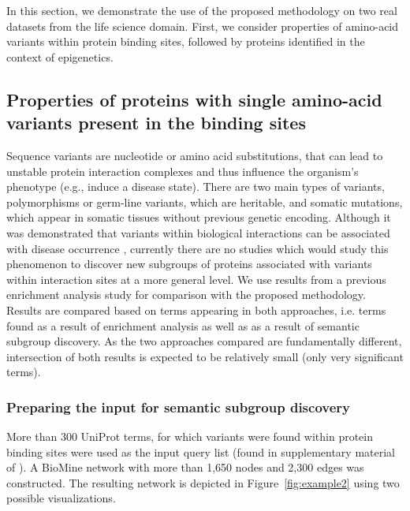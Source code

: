 \documentclass[oribibl,runningheads,a4paper]{llncs}
\begin{document}
In this section, we demonstrate the use of the proposed methodology on two real datasets from the life science domain. First, we consider properties of amino-acid variants within protein binding sites, followed by proteins identified in the context of epigenetics. %


\subsection{Properties of proteins with single amino-acid variants present in the binding sites}

Sequence variants are nucleotide or amino acid substitutions, that can lead to unstable protein interaction complexes and thus influence the organism's phenotype (e.g., induce a disease state). There are two main types of variants, polymorphisms or germ-line variants, which are heritable, and somatic mutations, which appear in somatic tissues without previous genetic encoding. Although it was demonstrated that variants within biological interactions can be associated with disease occurrence \cite{skrlj2017,skrlj2016computational,schroder2005single,kamburov2015comprehensive}, currently there are no studies which would study this phenomenon to discover new subgroups of proteins associated with variants within interaction sites at a more general level. We use  results from a previous enrichment analysis study \cite{skrlj2017} for comparison with the proposed methodology. Results are compared based on terms appearing in both approaches, i.e. terms found as a result of enrichment analysis as well as as a result of semantic subgroup discovery. As the two approaches compared are fundamentally different, intersection of both results is expected to be relatively small (only very significant terms).

\subsubsection{Preparing the input for semantic subgroup discovery}

More than 300 UniProt terms, for which variants were found within protein binding sites were used as the input query list (found in supplementary material of \cite{skrlj2017}). A BioMine network with more than 1,650 nodes and 2,300 edges was constructed. The resulting network is depicted in Figure~\ref{fig:example2} using two possible visualizations. 
\end{document}
